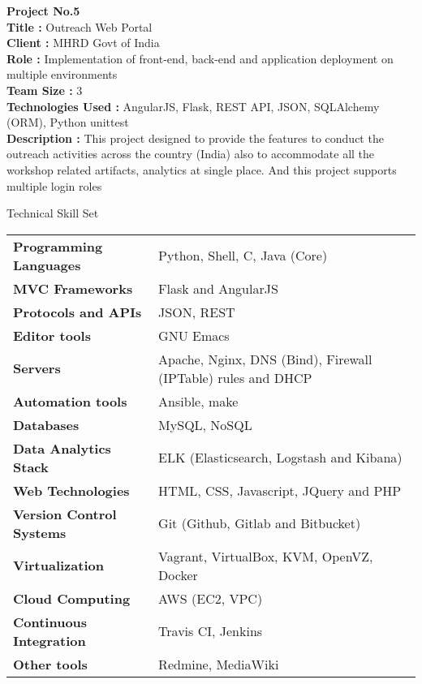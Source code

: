 \documentclass{resume} %
\begin{document}
\bigskip
\textbf {Project No.5} \\ \textbf{Title : } Outreach Web
Portal\\ \textbf{Client : } MHRD Govt of India \\ \textbf{Role : }
Implementation of front-end, back-end and application deployment on
multiple environments\\ \textbf{Team Size : } 3
\\ \textbf{Technologies Used :} AngularJS, Flask, REST API, JSON,
SQLAlchemy (ORM), Python unittest \\ \textbf{Description :} This
project designed to provide the features to conduct the outreach
activities across the country (India) also to accommodate all the
workshop related artifacts, analytics at single place. And this
project supports multiple login roles \\



\begin{rSection}
  {Technical Skill Set}

  \begin{tabular}{ @{} >{\bfseries}l @{\hspace{2ex}} l }
    Programming Languages & Python, Shell, C, Java (Core)
    \\ MVC Frameworks & Flask and AngularJS\\ Protocols and
    APIs & JSON, REST \\ Editor tools & GNU Emacs \\ Servers
    & Apache, Nginx, DNS (Bind), Firewall (IPTable) rules
    and DHCP \\ Automation tools & Ansible, make
    \\ Databases & MySQL, NoSQL \\ Data Analytics Stack &
    ELK (Elasticsearch, Logstash and Kibana) \\ Web
    Technologies & HTML, CSS, Javascript, JQuery and PHP
    \\ Version Control Systems & Git (Github, Gitlab and
    Bitbucket) \\ Virtualization & Vagrant, VirtualBox, KVM,
    OpenVZ, Docker \\ Cloud Computing & AWS (EC2, VPC)
    \\ Continuous Integration & Travis CI, Jenkins \\ Other
    tools & Redmine, MediaWiki
    
  \end{tabular}

\end{rSection}
\end{document}
